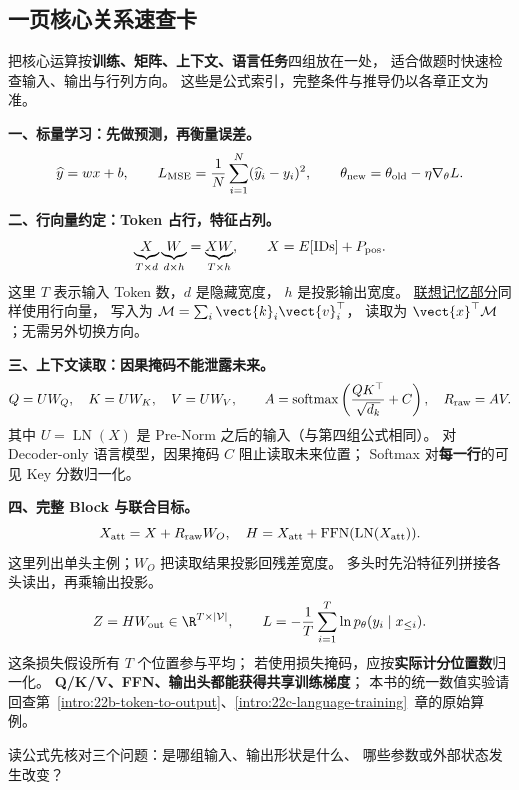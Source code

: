 \subsection{一页核心关系速查卡}
\label{app:core-formulas}

把核心运算按\textbf{训练、矩阵、上下文、语言任务}四组放在一处，
适合做题时快速检查输入、输出与行列方向。
这些是公式索引，完整条件与推导仍以各章正文为准。

\noindent\textbf{一、标量学习：先做预测，再衡量误差。}
\[
\widehat{y}=wx+b,\qquad
L_{\rm MSE}=\frac1N\sum_{i=1}^{N}(\widehat{y}_i-y_i)^2,
\qquad
\theta_{\rm new}=\theta_{\rm old}-\eta\nabla_\theta L.
\]

\noindent\textbf{二、行向量约定：Token 占行，特征占列。}
\[
\underbrace{X}_{T\times d}
\underbrace{W}_{d\times h}
=\underbrace{XW}_{T\times h},\qquad
X=E[\mathrm{IDs}]+P_{\rm pos}.
\]
这里 $T$ 表示输入 Token 数，$d$ 是隐藏宽度，
$h$ 是投影输出宽度。
\hyperref[intro:04-key-value-outer-product]{联想记忆部分}同样使用行向量，
写入为 $\mathcal{M}=\sum_i \vect{k}_i\vect{v}_i^\top$，
读取为 $\vect{x}^\top\mathcal{M}$；无需另外切换方向。

\noindent\textbf{三、上下文读取：因果掩码不能泄露未来。}
\[
Q=UW_Q,\quad K=UW_K,\quad V=UW_V,\qquad
A=\operatorname{softmax}\left(\frac{QK^\top}{\sqrt{d_k}}+C\right),
\quad R_{\rm raw}=AV.
\]
其中 $U=\operatorname{LN}(X)$ 是 Pre-Norm 之后的输入（与第四组公式相同）。
对 Decoder-only 语言模型，因果掩码 $C$ 阻止读取未来位置；
Softmax 对\textbf{每一行}的可见 Key 分数归一化。

\noindent\textbf{四、完整 Block 与联合目标。}
\[
X_{\rm att}=X+R_{\rm raw}W_O,
\quad
H=X_{\rm att}+\operatorname{FFN}(\operatorname{LN}(X_{\rm att})).
\]
这里列出单头主例；$W_O$ 把读取结果投影回残差宽度。
多头时先沿特征列拼接各头读出，再乘输出投影。
\[
Z=HW_{\rm out}\in\R^{T\times|\mathcal V|},
\qquad
L=-\frac1T\sum_{i=1}^{T}\ln p_\theta(y_i\mid x_{\le i}).
\]
这条损失假设所有 $T$ 个位置参与平均；
若使用损失掩码，应按\textbf{实际计分位置数}归一化。
\textbf{Q/K/V、FFN、输出头都能获得共享训练梯度}；
本书的统一数值实验请回查第~\ref*{intro:22b-token-to-output}、\ref*{intro:22c-language-training}~章的原始算例。

\par\smallskip
读公式先核对三个问题：是哪组输入、输出形状是什么、
哪些参数或外部状态发生改变？
